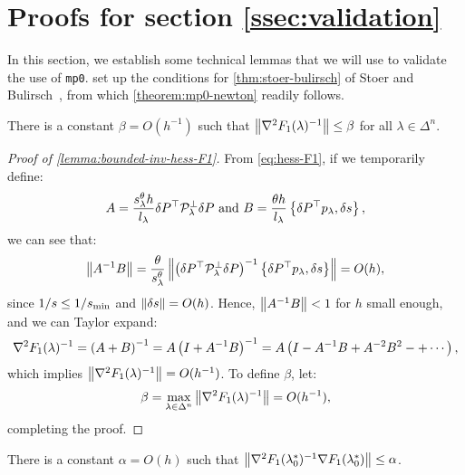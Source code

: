 \documentclass[eikonal.tex]{subfiles}
\begin{document}
\section{Proofs for section
  \ref{ssec:validation}}\label{app:validation-proofs} In this section, we establish some technical lemmas that we will use
to validate the use of
\texttt{mp0}. 
set up the conditions for \cref{thm:stoer-bulirsch} of Stoer and
Bulirsch~\cite{stoer2013introduction}, from which
\cref{theorem:mp0-newton} readily follows.

\begin{lemma}\label{lemma:bounded-inv-hess-F1}
  There is a constant $\beta = O(h^{-1})$ such that
  $\left\|\nabla^2 F_1(\lambda)^{-1}\right\| \leq \beta$ for all
  $\lambda \in \Delta^n$.
\end{lemma}

\begin{proof}[Proof of \cref{lemma:bounded-inv-hess-F1}]
  From \cref{eq:hess-F1}, if we temporarily define:
  \begin{equation}
    A = \frac{s^\theta_\lambda h}{l_\lambda} \delta P^\top \mathcal{P}^\perp_\lambda \delta P \mbox{ and } B = \frac{\theta h}{l_\lambda} \left\{\delta P^\top p_\lambda, \delta s\right\},
  \end{equation}
  we can see that:
  \begin{equation}
    \left\|A^{-1} B\right\| = \frac{\theta}{s^\theta_\lambda} \left\|\left(\delta P^\top \mathcal{P}^\perp_\lambda \delta P\right)^{-1} \left\{\delta P^\top p_\lambda, \delta s\right\}\right\| = O(h),
  \end{equation}
  since $1/s \leq 1/s_{\operatorname{min}}$ and $\left\|\delta s\right\| = O(h)$. Hence,
  $\left\|A^{-1} B\right\| < 1$ for $h$ small enough, and we can Taylor
  expand:
  \begin{equation}
    \nabla^2 F_1(\lambda)^{-1} = \left(A + B\right)^{-1} = A \left(I + A^{-1}B\right)^{-1} = A \left(I - A^{-1} B + A^{-2} B^2 - + \cdots\right),
  \end{equation}
  which implies $\left\|\nabla^2 F_1(\lambda)^{-1}\right\| = O(h^{-1})$. To
  define $\beta$, let:
  \begin{equation}
    \beta = \max_{\lambda \in \Delta^n} \left\|\nabla^2 F_1(\lambda)^{-1}\right\| = O(h^{-1}),
  \end{equation}
  completing the proof.
\end{proof}

\begin{lemma}\label{lemma:bounded-first-step}
  There is a constant $\alpha = O(h)$ such that
  $\left\|\nabla^2 F_1(\lambda_{0}^*)^{-1} \nabla F_1(\lambda_{0}^*)\right\|
  \leq \alpha$.
\end{lemma}
\end{document}
